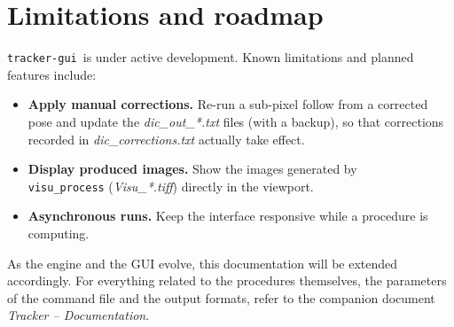 \documentclass{simpledoc}
\newcommand{\gui}{\screen{tracker-gui}}
\newcommand{\file}[1]{\textit{\color{myblue}#1}}
\newcommand{\screen}[1]{\texttt{\color{myblue}#1}}
\newcommand{\scr}[1]{\texttt{\color{myblue}#1}}
\begin{document}
\section{Limitations and roadmap}
\label{sec:limitations}

\gui\ is under active development. Known limitations and planned features include:

\begin{itemize}
  \item \textbf{Apply manual corrections.} Re-run a sub-pixel follow from a corrected pose and update
        the \file{dic\_out\_*.txt} files (with a backup), so that corrections recorded in
        \file{dic\_corrections.txt} actually take effect.
  \item \textbf{Display produced images.} Show the images generated by\\ \scr{visu\_process}
        (\file{Visu\_*.tiff}) directly in the viewport.
  \item \textbf{Asynchronous runs.} Keep the interface responsive while a procedure is computing.
\end{itemize}

As the engine and the GUI evolve, this documentation will be extended accordingly. For everything
related to the procedures themselves, the parameters of the command file and the output formats, refer
to the companion document \emph{Tracker -- Documentation}.
\end{document}
